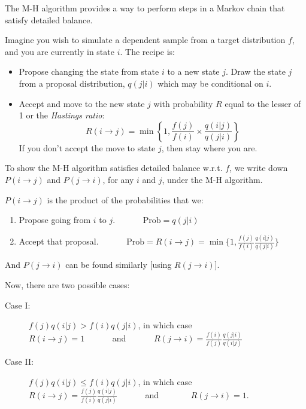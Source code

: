 The M-H algorithm provides a way to perform steps in a Markov chain that satisfy detailed balance. 

Imagine you wish to simulate a dependent sample from a target distribution $f$, and you are currently in state $i$.  The recipe is:
\begin{itemize}
\item Propose changing the state from state $i$ to a new state $j$.  Draw the state $j$ from a proposal distribution, $q(j|i)$ which may be conditional on $i$.
\item Accept and move to the new state $j$ with probability $R$ equal to the lesser of 1 or the {\em Hastings ratio}:
\[
	R(i\rightarrow j) = \min\left\{1,\frac{f(j)}{f(i)}\times\frac{q(i|j)}{q(j|i)}\right\}
\]
If you don't accept the move to state $j$, then stay where you are.
\end{itemize}




\enlargethispage*{1000pt}
\vspace*{-1.5em}

To show the M-H algorithm satisfies detailed balance w.r.t. $f$, we write down $P(i\rightarrow  j)$ and $P(j\rightarrow i)$, for any $i$ and $j$, under the M-H algorithm.

$P(i\rightarrow j)$ is the product of the probabilities that we:
\begin{enumerate}
\item Propose going from $i$ to $j$. ~~~~~~$\mathrm{Prob} =  q(j|i)$
\item Accept that proposal.  ~~~~~~$\mathrm{Prob} = R(i\rightarrow j)=\min\{1,\frac{f(j)}{f(i)} \frac{q(i|j)}{q(j|i)}\} $
\end{enumerate}
And $P(j\rightarrow i)$ can be found similarly [using $R(j\rightarrow i)$].

Now, there are two possible cases:
\begin{description}
\item[Case I:~~] $f(j)q(i|j) > f(i)q(j|i)$,  in which case \\$R(i\rightarrow j)=1$ ~~~~~~and~~~~~~  
$R(j\rightarrow i)=\frac{f(i)}{f(j)} \frac{q(j|i)}{q(i|j)}$
\item[Case II:~~] $f(j)q(i|j) \leq f(i)q(j|i)$, in which case \\
$R(i\rightarrow j)=\frac{f(j)}{f(i)} \frac{q(i|j)}{q(j|i)}$ ~~~~~~and~~~~~~~ $R(j\rightarrow i)=1$. 
\end{description}




